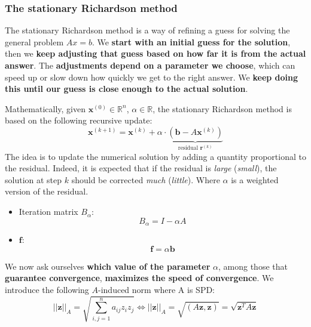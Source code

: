 \subsubsection{The stationary Richardson method}

The stationary Richardson method is a way of refining a guess for solving the general problem $Ax = b$. We \textbf{start with an initial guess for the solution}, then we \textbf{keep adjusting that guess based on how far it is from the actual answer}. The \textbf{adjustments depend on a parameter we choose}, which can speed up or slow down how quickly we get to the right answer. We \textbf{keep doing this until our guess is close enough to the actual solution}.

\highspace
Mathematically, given $\mathbf{x}^{\left(0\right)} \in \mathbb{R}^{n}$, $\alpha \in \mathbb{R}$, the stationary Richardson method is based on the following recursive update:
\begin{equation}\label{eq: stationary richardson x calcolus}
    \mathbf{x}^{\left(k+1\right)} = \mathbf{x}^{\left(k\right)} + \alpha \cdot \underbrace{\left(\mathbf{b} - A\mathbf{x}^{\left(k\right)}\right)}_{\text{residual }\mathbf{r}^{\left(k\right)}}
\end{equation}
The idea is to update the numerical solution by adding a quantity proportional to the residual. Indeed, it is expected that if the residual is \emph{large} (\emph{small}), the solution at step $k$ should be corrected \emph{much} (\emph{little}). Where $\alpha$ is a weighted version of the residual.
\begin{itemize}
    \item Iteration matrix $B_{\alpha}$:
    \begin{equation*}
        B_{\alpha} = I - \alpha A
    \end{equation*}
    \item $\mathbf{f}$:
    \begin{equation*}
        \mathbf{f} = \alpha \mathbf{b}
    \end{equation*}
\end{itemize}
We now ask ourselves \textbf{which value of the parameter} $\alpha$, among those that \textbf{guarantee convergence}, \textbf{maximizes the speed of convergence}. We introduce the following $A$-induced norm where A is SPD:
\begin{equation*}
    {\left|\left|\mathbf{z}\right|\right|}_{A} = \sqrt{
        \displaystyle\sum_{i,j = 1}^{n} a_{ij}z_{i}z_{j}
    }
    \iff
    {\left|\left|\mathbf{z}\right|\right|}_{A} = \sqrt{\left(A\mathbf{z}, \mathbf{z}\right)} = \sqrt{\mathbf{z}^{T} A \mathbf{z}}
\end{equation*}
